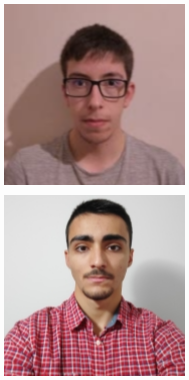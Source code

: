 \begin{titlepage}
    \begin{figure}[hbt!]
        \centering
        \begin{minipage}{0.333\textwidth}
            \centering
            \includegraphics[width=0.85\textwidth]{imagens/1.png}
        \end{minipage}\hfill
        \begin{minipage}{0.333\textwidth}
            \centering
            {\includegraphics[width=0.85\textwidth]{imagens/2.png}}
        \end{minipage}\hfill

\end{figure}
\end{titlepage}

